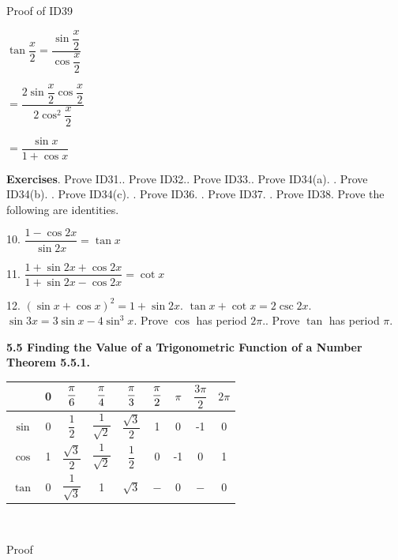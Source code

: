 Proof of ID39\nl

$\tan \dfrac{x}{2} = \dfrac{\sin \dfrac{x}{2}}{\cos \dfrac{x}{2}}$\nl

\newpage


\qquad \qquad $= \dfrac{2\sin \dfrac{x}{2} \cos \dfrac{x}{2}}{2\cos^{2} \dfrac{x}{2}}$\nl

\qquad \qquad $= \dfrac{\sin x}{1 + \cos x}$\nl

\textbf{Exercises}. Prove ID31.. Prove ID32.. Prove ID33.. Prove ID34(a). . Prove ID34(b). . Prove ID34(c). . Prove ID36.    . Prove ID37.    . 	Prove ID38. \nl
 Prove the following are identities. \nl

 10. $\dfrac{1 - \cos 2x}{\sin 2x} = \tan x $\nl

 11. $\dfrac{1 + \sin 2x + \cos 2x}{1 + \sin 2x - \cos 2x} = \cot x$\nl

 12. $(\sin x + \cos x)^{2} = 1 + \sin 2x$. $\tan x + \cot x = 2\csc 2x$. $\sin 3x = 3\sin x -4\sin^{3}x$. 	Prove $\cos$ has period $2\pi.$. 	Prove $\tan$ has period $\pi$.

 \newpage
\textbf{5.5 Finding the Value of a Trigonometric Function of a Number}\nl
\textbf{Theorem 5.5.1.}
\begin{center}
\begin{tabular}{|c |c |c |c |c |c |c |c |c|}\hline
&0&$\dfrac{\pi}{6}$ &$\dfrac{\pi}{4}$&$\dfrac{\pi}{3}$&$\dfrac{\pi}{2}$&$\pi$&$\dfrac{3\pi}{2}$&$2\pi$\\ \hline
$\sin$&0&$\dfrac{1}{2}$&$\dfrac{1}{\sqrt{2}}$&$\dfrac{\sqrt{3}}{2}$&1&0&-1&0\\ \hline
$\cos$&1&$\dfrac{\sqrt{3}}{2}$&$\dfrac{1}{\sqrt{2}}$&$\dfrac{1}{2}$&0&-1&0&1\\ \hline
$\tan$&0&$\dfrac {1}{\sqrt{3}}$&1&$\sqrt{3}$&$-$&0&$-$&0\\ \hline
\end{tabular}\\
\end{center}
Proof\nl


